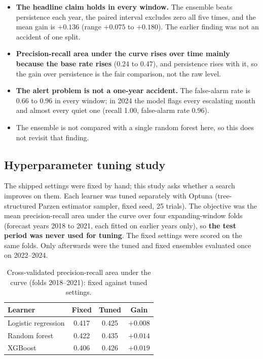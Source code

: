 \documentclass[11pt,a4paper]{article}
\begin{document}
\begin{itemize}
  \item \textbf{The headline claim holds in every window.} The ensemble beats persistence each year, the paired interval excludes zero all five times, and the mean gain is $+0.136$ (range $+0.075$ to $+0.180$). The earlier finding was not an accident of one split.
  \item \textbf{Precision-recall area under the curve rises over time mainly because the base rate rises} (0.24 to 0.47), and persistence rises with it, so the gain over persistence is the fair comparison, not the raw level.
  \item \textbf{The alert problem is not a one-year accident.} The false-alarm rate is 0.66 to 0.96 in every window; in 2024 the model flags every escalating month and almost every quiet one (recall 1.00, false-alarm rate 0.96).
  \item The ensemble is not compared with a single random forest here, so this does not revisit that finding.
\end{itemize}

\subsection{Hyperparameter tuning study}\label{sec:tune}
The shipped settings were fixed by hand; this study asks whether a search improves on them. Each learner was tuned separately with Optuna (tree-structured Parzen estimator sampler, fixed seed, 25 trials). The objective was the mean precision-recall area under the curve over four expanding-window folds
(forecast years 2018 to 2021, each fitted on earlier years only), so \textbf{the test period was never used for tuning}. The fixed settings were scored on the same folds. Only afterwards were the tuned and fixed ensembles evaluated once on 2022--2024.

\begin{table}[!htbp]
\centering\small
\caption{Cross-validated precision-recall area under the curve (folds 2018--2021): fixed against tuned settings.}
\begin{tabular}{@{}lccc@{}}
\toprule
\textbf{Learner} & \textbf{Fixed} & \textbf{Tuned} & \textbf{Gain} \\
\midrule
Logistic regression & 0.417 & 0.425 & $+0.008$ \\
Random forest & 0.422 & 0.435 & $+0.014$ \\
XGBoost & 0.406 & 0.426 & $+0.019$ \\
\bottomrule
\end{tabular}
\end{table}
\end{document}
